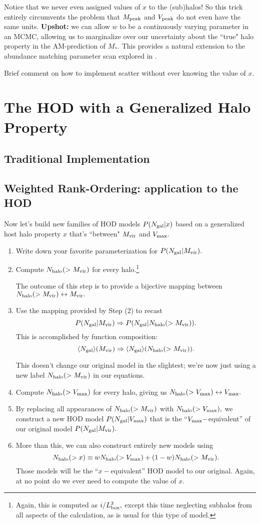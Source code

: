 \documentclass[usenatbib,usegraphicx,letterpaper]{mn2e}
\newcommand{\Ngal}{N_{\rm gal}}
\newcommand{\Nhalo}{N_{\rm halo}}
\newcommand{\vmax}{V_{\rm max}}
\newcommand{\mvir}{M_{\rm vir}}
\newcommand{\mpeak}{M_{\rm peak}}
\newcommand{\vpeak}{V_{\rm peak}}
\newcommand{\ben}{\begin{enumerate}}
\newcommand{\een}{\end{enumerate}}
\newcommand{\mstar}{M_{\ast}}
\begin{document}
Notice that we never even assigned values of $x$ to the (sub)halos! So this trick entirely circumvents the problem that $\mpeak$ and $\vpeak$ do not even have the same units. {\bf Upshot:} we can allow $w$ to be a continuously varying parameter in an MCMC, allowing us to  marginalize over our uncertainty about the ``true" halo property in the AM-prediction of $\mstar.$ This provides a natural extension to the abundance matching parameter scan explored in \citet{reddick12}. 

Brief comment on how to implement scatter without ever knowing the value of $x.$ 

\section{The HOD with a Generalized Halo Property}
\label{sec:hodclf}

\subsection{Traditional Implementation}
\label{subsec:tradhodclf}

\subsection{Weighted Rank-Ordering: application to the HOD}
\label{subsec:genhodclf}

Now let's build new families of HOD models $P(\Ngal|x)$ based on a generalized host halo property $x$ that's ``between" $\mvir$ and $\vmax.$ 

\ben
\item Write down your favorite parameterization for $P(\Ngal | \mvir).$
\item Compute $\Nhalo(>\mvir)$ for every halo.\footnote{Again, this is computed as $i/L_{\rm box}^{3},$ except this time neglecting subhalos from all aspects of the calculation, as is usual for this type of model.} 

The outcome of this step is to provide a bijective mapping between $\Nhalo(>\mvir)\leftrightarrow\mvir.$ 
\item Use the mapping provided by Step (2) to recast $$P(\Ngal | \mvir)\Rightarrow P(\Ngal |\Nhalo(>\mvir)).$$
This is accomplished by function composition: $$\langle\Ngal\rangle(\mvir)\Rightarrow\langle\Ngal\rangle(\Nhalo(>\mvir)).$$

This doesn't change our original model in the slightest; we're now just using a new label $\Nhalo(>\mvir)$ in our equations.
\item Compute $\Nhalo(>\vmax)$ for every halo, giving us $\Nhalo(>\vmax)\leftrightarrow\vmax.$ 
\item By replacing all appearances of $\Nhalo(>\mvir)$ with $\Nhalo(>\vmax),$ 
we construct a new HOD model $P(\Ngal|\vmax)$ that is the ``$\vmax-$equivalent'' of our original model $P(\Ngal | \mvir).$
\item More than this, we can also construct entirely new models using $$\Nhalo(>x) \equiv w\Nhalo(>\vmax) + (1-w)\Nhalo(>\mvir).$$ 
Those models will be the ``$x-$equivalent'' HOD model to our original. Again, at no point do we ever need to compute the value of $x.$
\een
\end{document}
